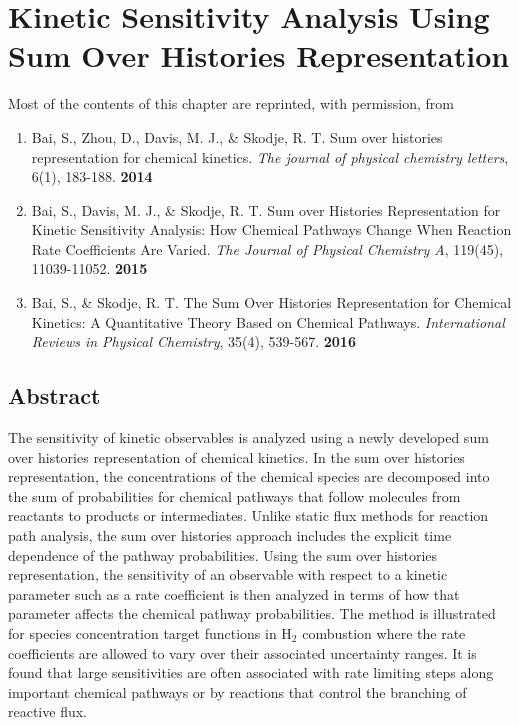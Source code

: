 \chapter{Kinetic Sensitivity Analysis Using Sum Over Histories Representation}
\label{chapter3}
Most of the contents of this chapter are reprinted, with permission, from \
\begin{enumerate}
\item[\cite{ch1_IRPC_16_ch3_6_ch4_8_bai2014sum}] Bai, S., Zhou, D., Davis, M. J., \& Skodje, R. T. Sum over histories representation for chemical kinetics. \textit{The journal of physical chemistry letters}, 6(1), 183-188. \textbf{2014}
\item[\cite{ch1_IRPC_17_ch4_9_bai2015sum}] Bai, S., Davis, M. J., \& Skodje, R. T. Sum over Histories Representation for Kinetic Sensitivity Analysis: How Chemical Pathways Change When Reaction Rate Coefficients Are Varied. \textit{The Journal of Physical Chemistry A}, 119(45), 11039-11052. \textbf{2015}
\item[\cite{ch4_10_bai2016sum}] Bai, S., \& Skodje, R. T. The Sum Over Histories Representation for Chemical Kinetics: A Quantitative Theory Based on Chemical Pathways. \textit{International Reviews in Physical Chemistry}, 35(4), 539-567. \textbf{2016}
\end{enumerate}

\section{Abstract}
The sensitivity of kinetic observables is analyzed using a newly
developed sum over histories representation of chemical kinetics. In the sum
over histories representation, the concentrations of the chemical species are
decomposed into the sum of probabilities for chemical pathways that follow
molecules from reactants to products or intermediates. Unlike static flux
methods for reaction path analysis, the sum over histories approach includes the
explicit time dependence of the pathway probabilities. Using the sum over
histories representation, the sensitivity of an observable with respect to a kinetic
parameter such as a rate coefficient is then analyzed in terms of how that
parameter affects the chemical pathway probabilities. The method is illustrated
for species concentration target functions in H$_2$ combustion where the rate
coefficients are allowed to vary over their associated uncertainty ranges. It is
found that large sensitivities are often associated with rate limiting steps along
important chemical pathways or by reactions that control the branching of
reactive flux.

